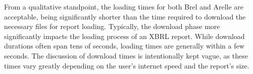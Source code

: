 From a qualitative standpoint, the loading times for both Brel and Arelle are acceptable,
being significantly shorter than the time required to download the necessary files for report loading.
Typically, the download phase more significantly impacts the loading process of an XBRL report.
While download durations often span tens of seconds, loading times are generally within a few seconds.
The discussion of download times is intentionally kept vague, as these times vary greatly depending on the user's internet speed and the report's size.
